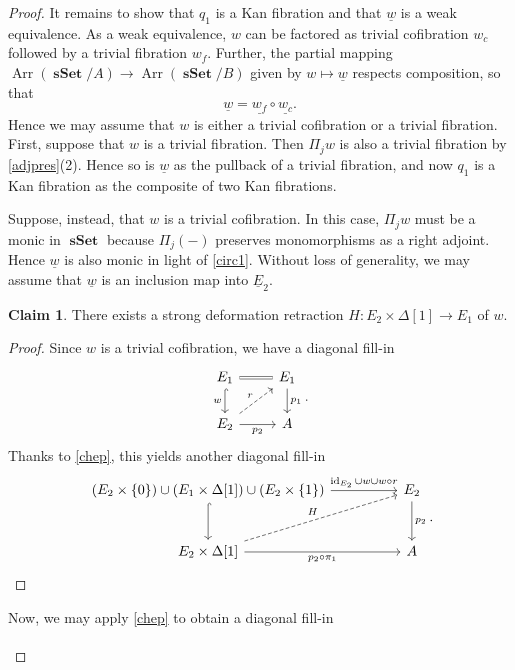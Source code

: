 \documentclass[10pt,letterpaper,cm]{nupset}
\theoremstyle{definition}
\theoremstyle{theorem}
\newtheorem*{claim}{Claim}
\theoremstyle{remark}
\newcommand{\0}{\mathbf{0}}
\newcommand{\1}{\mathbf{1}}
\newcommand{\2}{\mathbf{2}}
\DeclareMathOperator{\sset}{\mathbf{sSet}}
\DeclareMathOperator{\Ar}{Arr}
\DeclareMathOperator{\idd}{id}
\begin{document}
\begin{proof}
It remains to show that $q_1$ is a Kan fibration and that $\underline{w}$ is a weak equivalence. As a weak equivalence, $w$ can be factored as trivial cofibration $w_c$ followed by a trivial fibration $w_f$. Further, the partial mapping $\Ar(\sset/A)\to \Ar(\sset/B)$ given by $w\mapsto \underline{w}$  respects composition, so that $$\underline{w} = \underline{w_f}\circ \underline{w_c}.$$ Hence we may assume that $w$ is either a trivial cofibration or a trivial fibration. First, suppose that $w$ is a trivial fibration. Then $\Pi_j{w}$ is also a trivial fibration by \cref{adjpres}(2). Hence so is $\underline{w}$ as the pullback of a trivial fibration, and now $q_1$ is a Kan fibration as the composite of two Kan fibrations.

\medskip

Suppose, instead, that $w$ is a trivial cofibration. In this case, $\Pi_j{w}$ must be a monic in $\sset$ because $\Pi_j({-})$ preserves monomorphisms as a right adjoint. Hence $\underline{w}$ is also monic in light of \eqref{circ1}. Without loss of generality, we may assume that $\underline{w}$ is an inclusion map into $\underline{E}_2$. 
\begin{claim}
There exists a strong deformation retraction $H: E_2 \times \Delta[1] \to E_1$ of  $w$.
\end{claim}
\begin{proof}
Since $w$ is a trivial cofibration, we have a diagonal fill-in
\[
\begin{tikzcd}
E_1 \arrow[d, "w"', hook] \arrow[r, equal]           & E_1 \arrow[d, "p_1"] \\
E_2 \arrow[r, "p_2"'] \arrow[ru, "r", dashed] & A                   
\end{tikzcd}.
\] Thanks to \cref{chep}, this yields another diagonal fill-in
\[
\begin{tikzcd}[column sep=huge, row sep=large]
\mleft(E_2\times \mleft\{0\mright\}\mright)\cup \mleft(E_1\times \Delta[1]\mright)\cup \mleft(E_2\times \mleft\{1\mright\}\mright) \arrow[d, hook] \arrow[r, "\idd_{E_2}\cup w\cup w\circ r"] & E_2 \arrow[d, "p_2"] \\
{E_2\times \Delta[1]} \arrow[r, "p_2\circ \pi_1"'] \arrow[ru, "H", dashed]                                                                                                  & A                   
\end{tikzcd}
.\]
\end{proof}
Now, we may apply \cref{chep} to obtain a diagonal fill-in
\[
\begin{tikzcd}[column sep=huge, row sep=large]

\end{tikzcd}\]
\end{proof}
\end{document}
